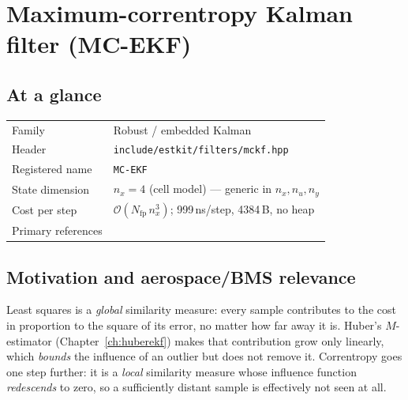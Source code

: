 \providecommand{\vf}{\bm{f}} \providecommand{\vh}{\bm{h}}
\providecommand{\vd}{\bm{d}} \providecommand{\mM}{\bm{M}}
\providecommand{\va}{\bm{a}} \providecommand{\vb}{\bm{b}}

\chapter{Maximum-correntropy Kalman filter (MC-EKF)}
\label{ch:mcekf}

\section*{At a glance}
\begin{tabular}{@{}l>{\raggedright\arraybackslash}p{}@{}}
Family & Robust / embedded Kalman \\
Header & \texttt{include/estkit/filters/mckf.hpp} \\
Registered name & \texttt{MC-EKF} \\
State dimension & $n_x = 4$ (cell model) --- generic in $n_x, n_u, n_y$ \\
Cost per step & $\mathcal{O}(N_{\mathrm{fp}}\,n_x^3)$; 999\,ns/step, 4384\,B, no heap \\
Primary references & \cite{chen2017mckf,liu2007correntropy,jazwinski1970,bucyjoseph1968} \\
\end{tabular}

\section{Motivation and aerospace/BMS relevance}
Least squares is a \emph{global} similarity measure: every sample contributes to the cost in
proportion to the square of its error, no matter how far away it is.  Huber's $M$-estimator
(Chapter~\ref{ch:huberekf}) makes that contribution grow only linearly, which \emph{bounds} the
influence of an outlier but does not remove it.  Correntropy goes one step further: it is a
\emph{local} similarity measure whose influence function \emph{redescends} to zero, so a
sufficiently distant sample is effectively not seen at all.

